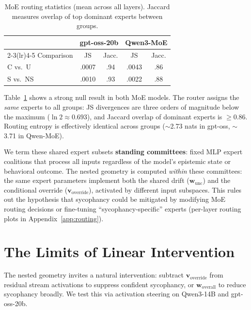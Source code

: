 \documentclass[11pt]{article}
\begin{document}
\begin{table}[t]
\caption{MoE routing statistics (mean across all layers). Jaccard measures overlap of top dominant experts between groups.}
\label{tab:routing}
\begin{center}
\begin{small}
\begin{sc}
\begin{tabular}{lcccc}
\toprule
 & \multicolumn{2}{c}{gpt-oss-20b} & \multicolumn{2}{c}{Qwen3-MoE} \\
\cmidrule(lr){2-3}\cmidrule(lr){4-5}
Comparison & JS & Jacc. & JS & Jacc. \\
\midrule
C vs.\ U & .0007 & .94 & .0043 & .86 \\
S vs.\ NS & .0010 & .93 & .0022 & .88 \\
\bottomrule
\end{tabular}
\end{sc}
\end{small}
\end{center}
\end{table}

Table~\ref{tab:routing} shows a strong null result in both MoE models.
The router assigns the \emph{same} experts to all groups: JS divergences are three orders of magnitude below the maximum ($\ln 2 \approx 0.693$), and Jaccard overlap of dominant experts is $\geq 0.86$.
Routing entropy is effectively identical across groups ($\sim$2.73 nats in gpt-oss, $\sim$3.71 in Qwen-MoE).

We term these shared expert subsets \textbf{standing committees}: fixed MLP expert coalitions that process all inputs regardless of the model's epistemic state or behavioral outcome.
The nested geometry is computed \emph{within} these committees: the same expert parameters implement both the shared drift ($\mathbf{w}_{\text{unc}}$) and the conditional override ($\mathbf{v}_{\text{override}}$), activated by different input subspaces.
This rules out the hypothesis that sycophancy could be mitigated by modifying MoE routing decisions or fine-tuning ``sycophancy-specific'' experts (per-layer routing plots in Appendix~\ref{app:routing}).


\section{The Limits of Linear Intervention}
\label{sec:steering}

The nested geometry invites a natural intervention: subtract $\mathbf{v}_{\text{override}}$ from residual stream activations to suppress confident sycophancy, or $\mathbf{w}_{\text{overall}}$ to reduce sycophancy broadly.
We test this via activation steering on Qwen3-14B and gpt-oss-20b.
\end{document}
